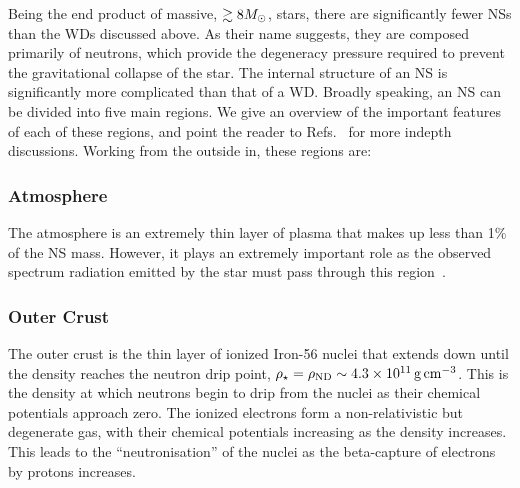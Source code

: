 Being the end product of massive, $\gtrsim 8 M_\odot$, stars, there are significantly fewer NSs than the WDs discussed above. As their name suggests, they are composed primarily of neutrons, which provide the degeneracy pressure required to prevent the gravitational collapse of the star.
The internal structure of an NS is significantly more complicated than that of a WD. Broadly speaking, an NS can be divided into five main regions. We give an overview of the important features of each of these regions, and point the reader to Refs.~\cite{Glendenning_Compactstarsnuclear, Lattimer:2004pg_Physicsneutronstars, Haensel_NeutronstarsEqation, Weber:2007ch_may_NeutronStarInteriors, Camenzind_Compactobjectsastrophysics, Ozel:2015fia_Densematterequation,Ozel:2016oaf_jul_MassesRadiiEquation,Lattimer:2021emm_jul_NeutronStarsNuclear} for more indepth discussions. Working from the outside in, these regions are:

\subsubsection*{Atmosphere}
The atmosphere is an extremely thin layer of plasma that makes up less than 1\% of the NS mass. However, it plays an extremely important role as the observed spectrum radiation emitted by the star must pass through this region~\cite{Lattimer:2004pg_Physicsneutronstars, Haensel_NeutronstarsEqation}.

\subsubsection*{Outer Crust}
The outer crust is the thin layer of ionized Iron-56 nuclei that extends down until the density reaches the neutron drip point, $\rho_\star = \rho_\mathrm{ND} \sim 4.3\times 10^{11}{\rm \,g}{\rm \,cm}^{-3}$. This is the density at which neutrons begin to drip from the nuclei as their chemical potentials approach zero. The ionized electrons form a non-relativistic but degenerate gas, with their chemical potentials increasing as the density increases. This leads to the ``neutronisation'' of the nuclei as the beta-capture of electrons by protons increases.

